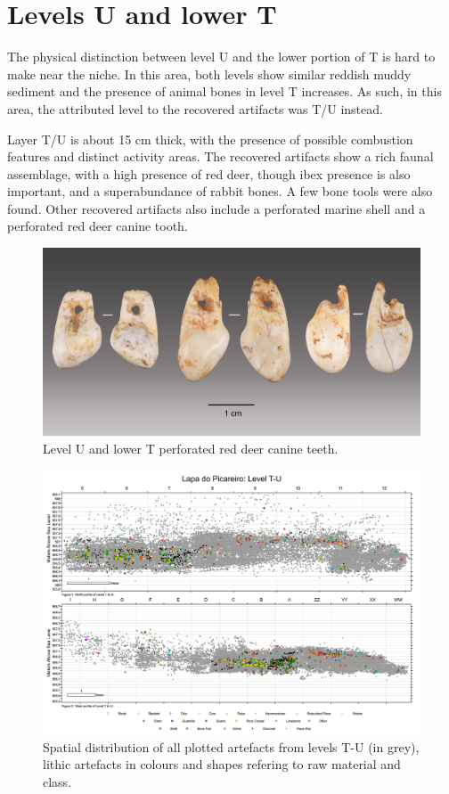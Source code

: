 \documentclass[12pt,twoside]{reedthesis}
\begin{document}
\hypertarget{levels-u-and-lower-t}{%
\section{Levels U and lower T}\label{levels-u-and-lower-t}}

The physical distinction between level U and the lower portion of T is hard to make near the niche. In this area, both levels show similar reddish muddy sediment and the presence of animal bones in level T increases. As such, in this area, the attributed level to the recovered artifacts was T/U instead.

Layer T/U is about 15 cm thick, with the presence of possible combustion features and distinct activity areas. The recovered artifacts show a rich faunal assemblage, with a high presence of red deer, though ibex presence is also important, and a superabundance of rabbit bones. A few bone tools were also found. Other recovered artifacts also include a perforated marine shell and a perforated red deer canine tooth.
\begin{figure}
\includegraphics[width=1\linewidth]{figure/LP_teeth} \caption{Level U and lower T perforated red deer canine teeth.}\label{fig:unnamed-chunk-8}
\end{figure}
\begin{figure}
\includegraphics[width=1\linewidth]{figure/LPspatial} \caption{Spatial distribution of all plotted artefacts from levels T-U (in grey), lithic artefacts in colours and shapes refering to raw material and class.}\label{fig:unnamed-chunk-9}
\end{figure}
\end{document}
